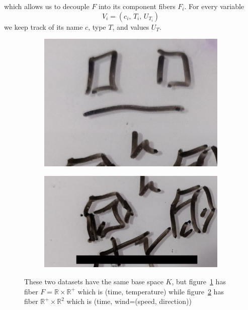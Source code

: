 \documentclass[../main.tex]{subfiles}
\begin{document}
which allows us to decouple $F$ into its component fibers $F_i$. For every variable
\begin{equation}
V_i = (c_i,\, T_i,\, U_{T_i})
\end{equation} 
we keep track of its name $c$, type $T$, and values $U_{T}$. 

\begin{figure}[H]
    \begin{subfigure}{.5\textwidth}
        \includegraphics[width=\textwidth]{figures/math/temp_2f.png}
        \caption{}
        \label{fig:fiber_example_plane}
    \end{subfigure}
    \begin{subfigure}{.5\textwidth}
        \includegraphics[width=\textwidth]{figures/math/temp_3f.png}
        \caption{}
        \label{fig:fiber_example_cube}
    \end{subfigure}
    \caption{These two datasets have the same base space $K$, but figure~\ref{fig:fiber_example_plane} has fiber  $F=\mathbb{R}\times\mathbb{R}^+$ which is (time, temperature) while figure~\ref{fig:fiber_example_cube} has fiber $\mathbb{R}^{+}\times\mathbb{R}^2$ which is (time, wind=(speed, direction))}
    \label{fig:data_fiber_example}
\end{figure}
\end{document}
